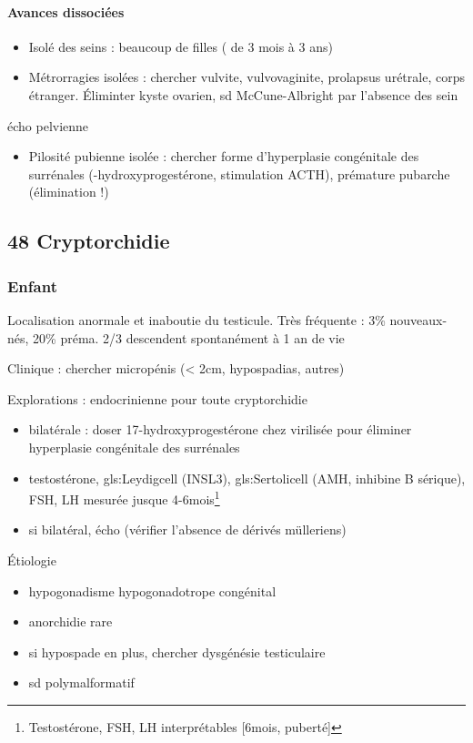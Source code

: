 \documentclass[11pt]{article}
\begin{document}
\paragraph{Avances dissociées}
\label{sec:orgca0ee94}
\begin{itemize}
\item Isolé des seins : beaucoup de filles ( de 3 mois à 3 ans)
\item Métrorragies isolées : chercher vulvite, vulvovaginite, prolapsus urétrale,
corps étranger. Éliminter kyste ovarien, sd McCune-Albright par l'absence des
sein
\end{itemize}
\thus écho pelvienne
\begin{itemize}
\item Pilosité pubienne isolée : chercher forme d'hyperplasie congénitale des
surrénales (-hydroxyprogestérone, stimulation ACTH), prémature pubarche
(élimination !)
\end{itemize}

\subsection{48 \textdagger{} Cryptorchidie}
\label{sec:org9a87590}
\subsubsection{Enfant}
\label{sec:org771bd4e}
Localisation anormale et inaboutie du testicule. Très fréquente : 3\%
nouveaux-nés, 20\% préma. 2/3 descendent spontanément à 1 an de vie

Clinique : chercher micropénis (< 2cm, hypospadias, autres)

Explorations : endocrinienne pour toute cryptorchidie \danger
\begin{itemize}
\item bilatérale : doser 17-hydroxyprogestérone chez \female{} virilisée pour éliminer hyperplasie
congénitale des surrénales
\item testostérone, gls:Leydigcell (INSL3), gls:Sertolicell (AMH, inhibine B sérique), FSH, LH mesurée jusque 4-6mois\footnote{\danger Testostérone, FSH, LH interprétables [6mois, puberté]}
\item si bilatéral, écho (vérifier l'absence de dérivés mülleriens)
\end{itemize}

Étiologie
\begin{itemize}
\item hypogonadisme hypogonadotrope congénital
\item anorchidie rare
\item si hypospade en plus, chercher dysgénésie testiculaire
\item sd polymalformatif
\end{itemize}
\end{document}

